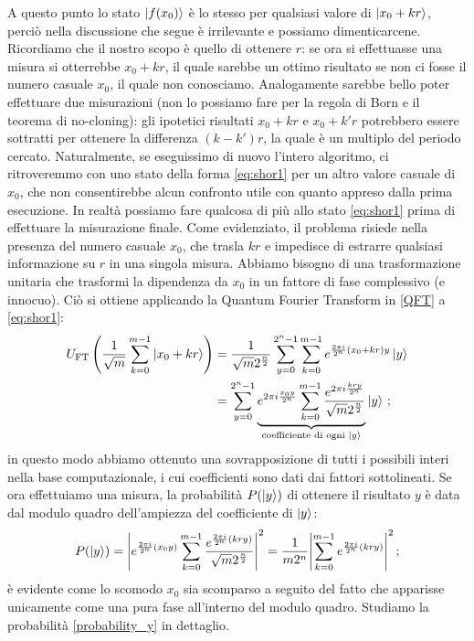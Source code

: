 A questo punto lo stato $\ket{f(x_0)}$ è lo stesso per qualsiasi valore di $\ket{x_0+kr}$, perciò nella discussione che segue è irrilevante e possiamo dimenticarcene. Ricordiamo che il nostro scopo è quello di ottenere $r$: se ora si effettuasse una misura si otterrebbe $x_0 + k r$, il quale sarebbe un ottimo risultato se non ci fosse il numero casuale $x_0$, il quale non conosciamo. Analogamente sarebbe bello poter effettuare due misurazioni (non lo possiamo fare per la regola di Born e il teorema di no-cloning): gli ipotetici risultati $x_0 + k r$ e $x_0 + k' r$ potrebbero essere sottratti per ottenere la differenza $(k-k')r$, la quale è un multiplo del periodo cercato. Naturalmente, se eseguissimo di nuovo l'intero algoritmo, ci ritroveremmo con uno stato della forma \eqref{eq:shor1} per un altro valore casuale di $x_0$, che non consentirebbe alcun confronto utile con quanto appreso dalla prima esecuzione. In realtà possiamo fare qualcosa di più allo stato \eqref{eq:shor1} prima di effettuare la misurazione finale. Come evidenziato, il problema risiede nella presenza del numero casuale $x_0$, che trasla $kr$ e impedisce di estrarre qualsiasi informazione su $r$ in una singola misura. Abbiamo bisogno di una trasformazione unitaria che trasformi la dipendenza da $x_0$ in un fattore di fase complessivo (e innocuo). Ciò si ottiene applicando la Quantum Fourier Transform in \eqref{QFT} a \eqref{eq:shor1}:
\begin{align*}
    U_{\text{FT}} \left( \frac{1}{\sqrt m}\sum_{k=0}^{m-1}\ket{x_0+kr} \right) &= \frac{1}{\sqrt{m}2^{\frac{n}{2}}} \sum_{y=0}^{2^n-1}\sum_{k=0}^{m-1}e^{\frac{2 \pi i}{2^n} (x_0+kr)y} \ket y \\
    &= \sum_{y=0}^{2^n-1} \underbrace{e^{2\pi i \frac{x_0 y}{2^n}}\sum_{k=0}^{m-1}\frac{e^{2\pi i \frac{kry}{2^n}}}{\sqrt{m}2^{\frac n2}}}_{\substack{\text{coefficiente di ogni } \ket{y}}} \ket y \, ;
\end{align*}
in questo modo abbiamo ottenuto una sovrapposizione di tutti i possibili interi nella base computazionale, i cui coefficienti sono dati dai fattori sottolineati. Se ora effettuiamo una misura, la probabilità $P( \ket{y})$ di ottenere il risultato $y$ è data dal modulo quadro dell'ampiezza del coefficiente di $\ket y$:
\begin{equation}\label{probability_y}
    P(\ket{y}) = \abs{ e^{\frac{2 \pi i}{2^n}(x_0 y)} \sum_{k=0}^{m-1}\frac{e^{\frac{2 \pi i}{2^n} (kry)}}{\sqrt{m}2^{\frac n2}}}^2 = \frac{1}{m2^n}\abs{\sum_{k=0}^{m-1}e^{\frac{2 \pi i}{2^n} (kry)}}^2 \, ;
\end{equation}
è evidente come lo scomodo $x_0$ sia scomparso a seguito del fatto che apparisse unicamente come una pura fase all'interno del modulo quadro. Studiamo la probabilità \eqref{probability_y} in dettaglio.

